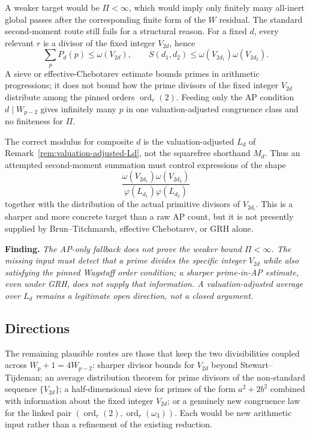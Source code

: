 \documentclass[11pt]{amsart}
\theoremstyle{plain}
\theoremstyle{definition}
\theoremstyle{remark}
\numberwithin{equation}{section}
\newcommand{\ord}{\operatorname{ord}}
\begin{document}
A weaker target would be $\Pi<\infty$, which would imply only finitely many all-inert global passes after the corresponding finite form of the $W$ residual. The standard second-moment route still fails for a structural reason. For a fixed $d$, every relevant $r$ is a divisor of the fixed integer $V_{2d}$, hence
\[
  \sum_p P_d(p)\leq \omega(V_{2d}),\qquad
  S(d_1,d_2)\leq \omega(V_{2d_1})\omega(V_{2d_2}).
\]
A sieve or effective-Chebotarev estimate bounds primes in arithmetic progressions; it does not bound how the prime divisors of the fixed integer $V_{2d}$ distribute among the pinned orders $\ord_r(2)$. Feeding only the AP condition $d\mid W_{p-2}$ gives infinitely many $p$ in one valuation-adjusted congruence class and no finiteness for $\Pi$.

The correct modulus for composite $d$ is the valuation-adjusted $L_d$ of Remark~\ref{rem:valuation-adjusted-Ld}, not the squarefree shorthand $M_d$. Thus an attempted second-moment summation must control expressions of the shape
\[
  \frac{\omega(V_{2d_1})\omega(V_{2d_2})}
       {\varphi(L_{d_1})\varphi(L_{d_2})}
\]
together with the distribution of the actual primitive divisors of $V_{2d_i}$. This is a sharper and more concrete target than a raw AP count, but it is not presently supplied by Brun--Titchmarsh, effective Chebotarev, or GRH alone.

\medskip
\noindent\textbf{Finding.} \emph{The AP-only fallback does not prove the weaker bound $\Pi<\infty$. The missing input must detect that a prime divides the specific integer $V_{2d}$ while also satisfying the pinned Wagstaff order condition; a sharper prime-in-AP estimate, even under GRH, does not supply that information. A valuation-adjusted average over $L_d$ remains a legitimate open direction, not a closed argument.}
\medskip

\subsection{Directions}\label{sec:pppc-directions}

The remaining plausible routes are those that keep the two divisibilities coupled across $W_p+1=4W_{p-2}$: sharper divisor bounds for $V_{2d}$ beyond Stewart--Tijdeman; an average distribution theorem for prime divisors of the non-standard sequence $\{V_{2d}\}$; a half-dimensional sieve for primes of the form $a^2+2b^2$ combined with information about the fixed integer $V_{2d}$; or a genuinely new congruence law for the linked pair $(\ord_r(2),\ord_r(\omega_3))$. Each would be new arithmetic input rather than a refinement of the existing reduction.
\end{document}
